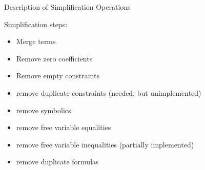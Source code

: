 \documentclass[journal,10pt]{IEEEtran}
\begin{document}
\begin{section}{Description of Simplification Operations}

Simplification steps:

\begin{itemize}
\item Merge terms
\item Remove zero coefficients
\item Remove empty constraints
\item remove duplicate constraints (needed, but unimplemented)
\item remove symbolics
\item remove free variable equalities
\item remove free variable inequalities (partially implemented)
\item remove duplicate formulas
\end{itemize}

\end{section}
\end{document}
